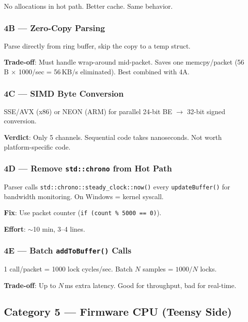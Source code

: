 \documentclass[11pt,a4paper]{article}
\begin{document}
No allocations in hot path. Better cache. Same behavior.

\subsubsection{4B --- Zero-Copy Parsing}

Parse directly from ring buffer, skip the copy to a temp struct.

\textbf{Trade-off}: Must handle wrap-around mid-packet. Saves one memcpy/packet (56\,B $\times$ 1000/sec = 56\,KB/s eliminated). Best combined with 4A.

\subsubsection{4C --- SIMD Byte Conversion}

SSE/AVX (x86) or NEON (ARM) for parallel 24-bit BE $\to$ 32-bit signed conversion.

\textbf{Verdict}: Only 5 channels. Sequential code takes nanoseconds. Not worth platform-specific code.

\subsubsection{4D --- Remove \texttt{std::chrono} from Hot Path}

Parser calls \texttt{std::chrono::steady\_clock::now()} every \texttt{updateBuffer()} for bandwidth monitoring. On Windows = kernel syscall.

\textbf{Fix}: Use packet counter (\texttt{if (count \% 5000 == 0)}).

\textbf{Effort}: ${\sim}$10 min, 3--4 lines.

\subsubsection{4E --- Batch \texttt{addToBuffer()} Calls}

1 call/packet = 1000 lock cycles/sec. Batch $N$ samples = $1000/N$ locks.

\textbf{Trade-off}: Up to $N$\,ms extra latency. Good for throughput, bad for real-time.

\subsection{Category 5 --- Firmware CPU (Teensy Side)}
\end{document}
